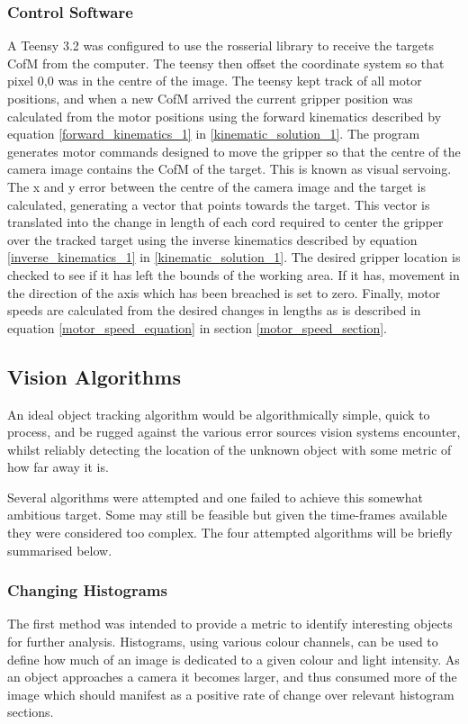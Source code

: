 \documentclass[conference]{IEEEtran}
\begin{document}
	\subsubsection{Control Software}
	A Teensy 3.2 was configured to use the rosserial library to receive the targets CofM from the computer. The teensy then offset the coordinate system so that pixel 0,0 was in the centre of the image. The teensy kept track of all motor positions, and when a new CofM arrived the current gripper position was calculated from the motor positions using the forward kinematics described by equation \ref{forward_kinematics_1} in \ref{kinematic_solution_1}. The program generates motor commands designed to move the gripper so that the centre of the camera image contains the CofM of the target. This is known as visual servoing. The x and y error between the centre of the camera image and the target is calculated, generating a vector that points towards the target. This vector is translated into the change in length of each cord required to center the gripper over the tracked target using the inverse kinematics described by equation \ref{inverse_kinematics_1} in \ref{kinematic_solution_1}. The desired gripper location is checked to see if it has left the bounds of the working area. If it has, movement in the direction of the axis which has been breached is set to zero. Finally, motor speeds are calculated from the desired changes in lengths as is described in equation \ref{motor_speed_equation} in section \ref{motor_speed_section}.
	
	\subsection{Vision Algorithms}
	An ideal object tracking algorithm would be algorithmically simple, quick to process, and be rugged against the various error sources vision systems encounter, whilst reliably detecting the location of the unknown object with some metric of how far away it is.
	
	Several algorithms were attempted and one failed to achieve this somewhat ambitious target. Some may still be feasible but given the time-frames available they were considered too complex. The four attempted algorithms will be briefly summarised below.
	
	\subsubsection{Changing Histograms}
	The first method was intended to provide a metric to identify interesting objects for further analysis. Histograms, using various colour channels, can be used to define how much of an image is dedicated to a given colour and light intensity. As an object approaches a camera it becomes larger, and thus consumed more of the image which should manifest as a positive rate of change over relevant histogram sections.
	
\end{document}
